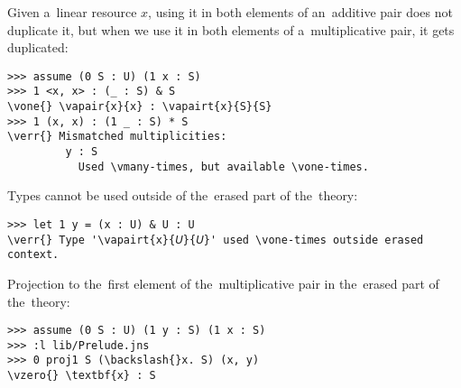 Given a~linear resource $x$, using it in both elements of an~additive pair does
not duplicate it, but when we use it in both elements of a~multiplicative pair,
it gets duplicated:
\begin{Verbatim}
>>> assume (0 S : U) (1 x : S)
>>> 1 <x, x> : (_ : S) & S
\vone{} \vapair{x}{x} : \vapairt{x}{S}{S}
>>> 1 (x, x) : (1 _ : S) * S
\verr{} Mismatched multiplicities:
         y : S
           Used \vmany-times, but available \vone-times.
\end{Verbatim}

Types cannot be used outside of the~erased part of the~theory:
\begin{Verbatim}
>>> let 1 y = (x : U) & U : U
\verr{} Type '\vapairt{x}{𝘜}{𝘜}' used \vone-times outside erased context.
\end{Verbatim}

Projection to the~first element of the~multiplicative pair in the~erased part of
the~theory:
\begin{Verbatim}
>>> assume (0 S : U) (1 y : S) (1 x : S)
>>> :l lib/Prelude.jns
>>> 0 proj1 S (\backslash{}x. S) (x, y)
\vzero{} \textbf{x} : S
\end{Verbatim}
